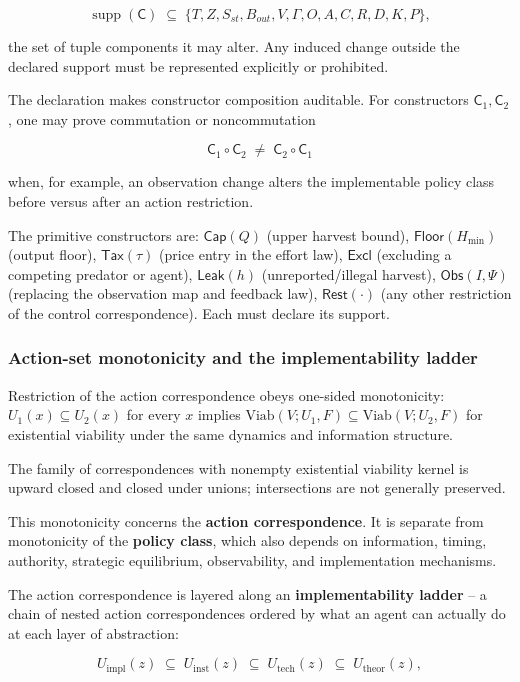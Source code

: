 \[\operatorname{supp}(\mathsf{C}) \;\subseteq\; \{ T, Z, S_{st}, B_{out}, V, \Gamma, O, A, C, R, D, K, P \},\]

the set of tuple components it may alter. Any induced change outside the declared support must be represented explicitly or prohibited.

The declaration makes constructor composition auditable. For constructors $\mathsf{C}_1, \mathsf{C}_2$, one may prove commutation or noncommutation

\[\mathsf{C}_1 \circ \mathsf{C}_2 \;\neq\; \mathsf{C}_2 \circ \mathsf{C}_1\]

when, for example, an observation change alters the implementable policy class before versus after an action restriction.

The primitive constructors are: $\mathsf{Cap}(Q)$ (upper harvest bound), $\mathsf{Floor}(H_{\min})$ (output floor), $\mathsf{Tax}(\tau)$ (price entry in the effort law), $\mathsf{Excl}$ (excluding a competing predator or agent), $\mathsf{Leak}(h)$ (unreported/illegal harvest), $\mathsf{Obs}(I, \Psi)$ (replacing the observation map and feedback law), $\mathsf{Rest}(\cdot)$ (any other restriction of the control correspondence). Each must declare its support.

\subsubsection{Action-set monotonicity and the implementability ladder}

Restriction of the action correspondence obeys one-sided monotonicity: $U_1(x) \subseteq U_2(x)$ for every $x$ implies $\mathrm{Viab}(V; U_1, F) \subseteq \mathrm{Viab}(V; U_2, F)$ for existential viability under the same dynamics and information structure.

The family of correspondences with nonempty existential viability kernel is upward closed and closed under unions; intersections are not generally preserved.

This monotonicity concerns the \textbf{action correspondence}. It is separate from monotonicity of the \textbf{policy class}, which also depends on information, timing, authority, strategic equilibrium, observability, and implementation mechanisms.

The action correspondence is layered along an \textbf{implementability ladder} -- a chain of nested action correspondences ordered by what an agent can actually do at each layer of abstraction:

\[U_{\mathrm{impl}}(z) \;\subseteq\; U_{\mathrm{inst}}(z) \;\subseteq\; U_{\mathrm{tech}}(z) \;\subseteq\; U_{\mathrm{theor}}(z),\]

